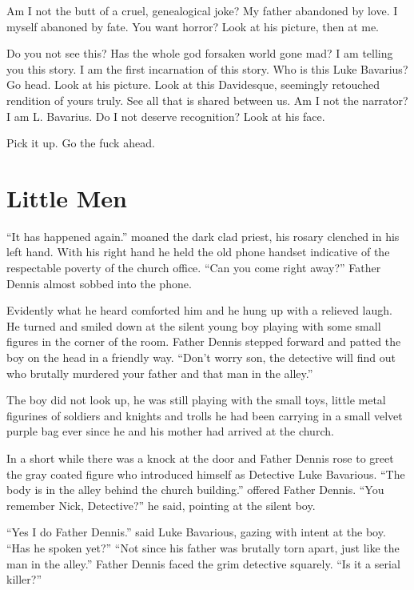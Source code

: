 Am I not the butt of a cruel, genealogical joke? My father
abandoned by love. I myself abanoned by fate. You want horror? Look
at his picture, then at me.

Do you not see this? Has the whole god forsaken world gone mad? I
am telling you this story. I am the first incarnation of this
story. Who is this Luke Bavarius? Go head. Look at his picture.
Look at this Davidesque, seemingly retouched rendition of yours
truly. See all that is shared between us. Am I not the narrator? I
am L. Bavarius. Do I not deserve recognition? Look at his
face.

Pick it up. Go the fuck ahead. 
 





\chapter{Little Men}



``It has happened again.'' moaned the dark clad priest, his rosary
clenched in his left hand. With his right hand he held the old
phone handset indicative of the respectable poverty of the church
office. ``Can you come right away?'' Father Dennis almost sobbed into
the phone.

Evidently what he heard comforted him and he hung up with a
relieved laugh. He turned and smiled down at the silent young boy
playing with some small figures in the corner of the room. Father
Dennis stepped forward and patted the boy on the head in a friendly
way. ``Don't worry son, the detective will find out who brutally
murdered your father and that man in the alley.''

The boy did not look up, he was still playing with the small toys,
little metal figurines of soldiers and knights and trolls he had
been carrying in a small velvet purple bag ever since he and his
mother had arrived at the church.

In a short while there was a knock at the door and Father Dennis
rose to greet the gray coated figure who introduced himself as
Detective Luke Bavarious. ``The body is in the alley behind the
church building.'' offered Father Dennis. ``You remember Nick,
Detective?'' he said, pointing at the silent boy.

``Yes I do Father Dennis.'' said Luke Bavarious, gazing with intent
at the boy. ``Has he spoken yet?'' ``Not since his father was brutally
torn apart, just like the man in the alley.'' Father Dennis faced
the grim detective squarely. ``Is it a serial killer?''


